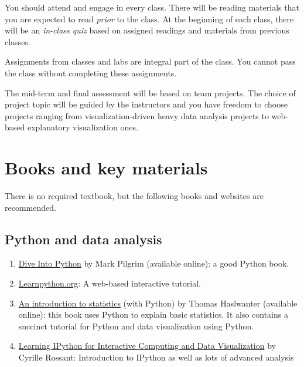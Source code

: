 \documentclass[11pt,article,oneside]{memoir}
\begin{document}
You should attend and engage in every class. There will be reading materials
that you are expected to read \emph{prior} to the class. At the beginning of
each class, there will be an \emph{in-class quiz} based on assigned readings
and materials from previous classes.  

Assignments from classes and labs are integral part of the class. You cannot
pass the class without completing these assignments. 

The mid-term and final assessment will be based on team projects. The choice of
project topic will be guided by the instructors and you have freedom to choose
projects ranging from visualization-driven heavy data analysis projects to
web-based explanatory visualization ones. 

\section{Books and key materials}

There is no required textbook, but the following books and websites are
recommended.

\subsection{Python and data analysis}

\begin{enumerate}

\item \href{http://www.diveintopython3.net/index.html}{Dive Into Python} by Mark Pilgrim (available online): a good Python book. 

\item \href{http://www.learnpython.org}{Learnpython.org}: A web-based interactive tutorial. 

\item \href{http://work.thaslwanter.at/Stats/html/}{An introduction to statistics} (with Python) by Thomas Haslwanter (available online): this book uses Python to explain basic statistics. It also contains a succinct tutorial for Python and data visualization using Python. 

\item \href{http://ipython.rossant.net}{Learning IPython for Interactive Computing and Data Visualization} by  Cyrille Rossant: Introduction to IPython as well as lots of advanced analysis 


\end{enumerate}
\end{document}
